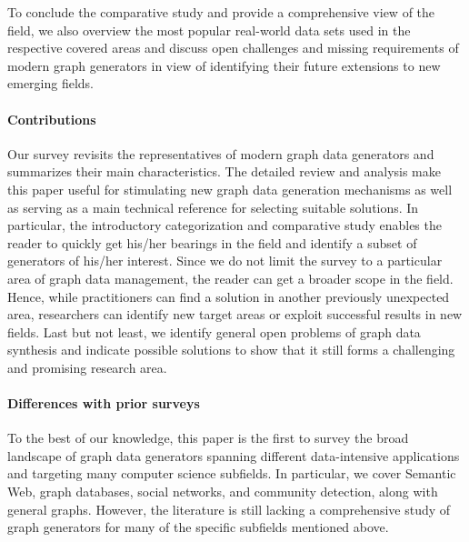 To conclude the comparative study and provide a comprehensive view of the
field,  we also overview the most popular real-world data sets used in the respective covered areas and discuss open challenges and missing requirements of modern
graph generators in view of identifying their future extensions to new emerging fields.


\paragraph*{Contributions} Our survey revisits the representatives of
modern graph data generators and summarizes their main characteristics. The detailed review 
and analysis make this paper useful for stimulating new graph data generation mechanisms as well as 
serving as a main technical reference for selecting suitable solutions. In particular, the introductory 
categorization and comparative study enables the reader to quickly get his/her bearings in the field and 
identify a subset of generators of his/her interest. Since we do not limit the survey to a particular area of graph data management,  the reader can get a broader scope in the field. Hence, while practitioners can find a solution in another previously unexpected area, researchers can identify new target areas or exploit successful results in new fields. Last but not least, %
we identify general open problems of graph data synthesis and indicate possible solutions to show that it still forms a challenging and promising research area.

\paragraph*{Differences with prior surveys}

To the best of our knowledge, this paper is the first to survey the broad
landscape of graph data generators spanning different data-intensive applications and
targeting many computer science subfields. In particular, we cover Semantic Web, graph databases, social networks, and community detection, along with general graphs. However, the literature is still lacking a comprehensive study of graph generators  for many of the specific subfields mentioned above.

